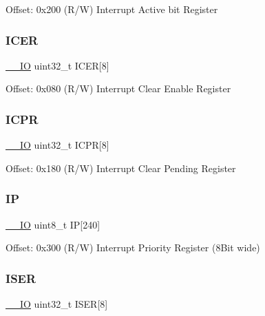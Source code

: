 Offset\+: 0x200 (R/W) Interrupt Active bit Register \mbox{\label{struct_n_v_i_c___type_af458bc93cfb899fc1c77c5d1f39dde88}} 
\subsubsection{\texorpdfstring{I\+C\+ER}{ICER}}
{\footnotesize\ttfamily \mbox{\hyperlink{core__cm3_8h_aec43007d9998a0a0e01faede4133d6be}{\+\_\+\+\_\+\+IO}} uint32\+\_\+t I\+C\+ER\mbox{[}8\mbox{]}}

Offset\+: 0x080 (R/W) Interrupt Clear Enable Register \mbox{\label{struct_n_v_i_c___type_a8165d9a8c0090021e56bbe91c2c44667}} 
\subsubsection{\texorpdfstring{I\+C\+PR}{ICPR}}
{\footnotesize\ttfamily \mbox{\hyperlink{core__cm3_8h_aec43007d9998a0a0e01faede4133d6be}{\+\_\+\+\_\+\+IO}} uint32\+\_\+t I\+C\+PR\mbox{[}8\mbox{]}}

Offset\+: 0x180 (R/W) Interrupt Clear Pending Register \mbox{\label{struct_n_v_i_c___type_a38c377984f751265667317981f101bb4}} 
\subsubsection{\texorpdfstring{IP}{IP}}
{\footnotesize\ttfamily \mbox{\hyperlink{core__cm3_8h_aec43007d9998a0a0e01faede4133d6be}{\+\_\+\+\_\+\+IO}} uint8\+\_\+t IP\mbox{[}240\mbox{]}}

Offset\+: 0x300 (R/W) Interrupt Priority Register (8\+Bit wide) \mbox{\label{struct_n_v_i_c___type_a0bf79013b539f9f929c75bd50f8ec67d}} 
\subsubsection{\texorpdfstring{I\+S\+ER}{ISER}}
{\footnotesize\ttfamily \mbox{\hyperlink{core__cm3_8h_aec43007d9998a0a0e01faede4133d6be}{\+\_\+\+\_\+\+IO}} uint32\+\_\+t I\+S\+ER\mbox{[}8\mbox{]}}

